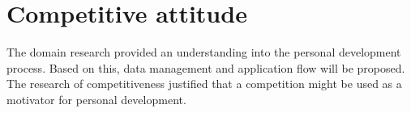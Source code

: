 
\section{Competitive attitude}\label{sec:domain-conclusion}

The domain research provided an understanding into the personal development process.
Based on this, data management and application flow will be proposed.
The research of competitiveness justified that a competition might be used as a motivator for personal development.